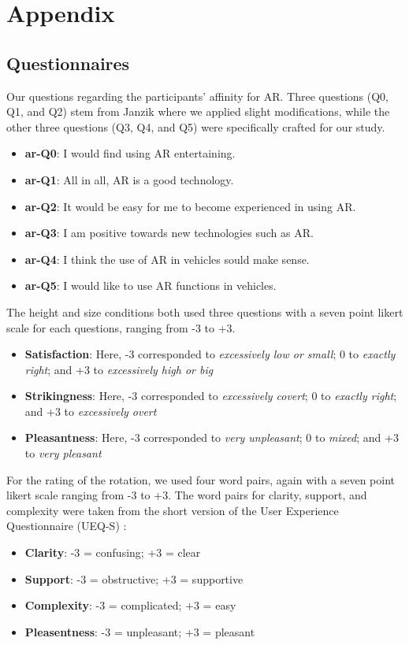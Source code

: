 \section{Appendix}

\subsection{Questionnaires}
\label{sec:AppendixQuestionnaires}

Our questions regarding the participants' affinity for AR. Three questions (Q0, Q1, and Q2) stem from Janzik \cite{janzik2022studie} where we applied slight modifications, while the other three questions (Q3, Q4, and Q5) were specifically crafted for our study.
\begin{itemize}
    \item \textbf{ar-Q0}: I would find using AR entertaining.
    \item \textbf{ar-Q1}: All in all, AR is a good technology.
    \item \textbf{ar-Q2}: It would be easy for me to become experienced in using AR.
    \item \textbf{ar-Q3}: I am positive towards new technologies such as AR.
    \item \textbf{ar-Q4}: I think the use of AR in vehicles sould make sense.
    \item \textbf{ar-Q5}: I would like to use AR functions in vehicles.
\end{itemize}



The height and size conditions both used three questions with a seven point likert scale for each questions, ranging from -3 to +3.
\begin{itemize}
    \item \textbf{Satisfaction}: Here, -3 corresponded to \textit{excessively low or small}; 0 to \textit{exactly right}; and +3 to \textit{excessively high or big}
    \item \textbf{Strikingness}: Here, -3 corresponded to \textit{excessively covert}; 0 to \textit{exactly right}; and +3 to \textit{excessively overt}
    \item \textbf{Pleasantness}: Here, -3 corresponded to \textit{very unpleasant}; 0 to \textit{mixed}; and +3 to \textit{very pleasant}
\end{itemize}

For the rating of the rotation, we used four word pairs, again with a seven point likert scale ranging from -3 to +3. The word pairs for clarity, support, and complexity were taken from the short version of the User Experience Questionnaire (UEQ-S) \cite{schrepp2017design}:
\begin{itemize}
    \item \textbf{Clarity}: -3 = confusing; +3 = clear
    \item \textbf{Support}: -3 = obstructive; +3 = supportive
    \item \textbf{Complexity}: -3 = complicated; +3 = easy
    \item \textbf{Pleasentness}: -3 = unpleasant; +3 = pleasant
\end{itemize}

